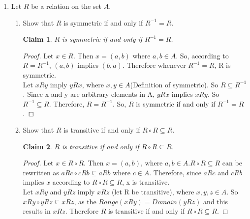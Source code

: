 \documentclass[11pt]{letter}
\newtheorem{claim}{Claim}
\theoremstyle{definition}
\begin{document}
\begin{description}
\begin{enumerate}
\begin{enumerate}
                          
			\end{enumerate}
		
		\item  Let $R$ be a relation on the set $A$. 
			\begin{enumerate}
			\item Show that $R$ is symmetric if and only if $R^{-1}=R$.
                          \begin{claim}
                            $R$ is symmetric if and only if $R^{-1}=R$.
                          \end{claim}
                          \begin{proof}
                            Let $x\in R$. Then $x=(a,b)$ where $a,b\in A$. So, according to $R=R^{-1}$, $(a,b)$ implies $(b,a)$. Therefore whenever $R^{-1}=R$, R is symmetric. \\
                            Let $xRy$ imply $yRx$, where $x,y\in A$(Definition of symmetric). So $R\subseteq R^{-1}$. Since x and y are arbitrary elements in A, $yRx$ implies $xRy$. So $R^{-1}\subseteq R$. Therefore, $R=R^{-1}$. So, $R$ is symmetric if and only if $R^{-1}=R$.
                          \end{proof}
                          
                          
			\item Show that $R$ is transitive if and only if $R\circ R\subseteq R$.
                          \begin{claim}
                            $R$ is transitive if and only if $R\circ R\subseteq R$.
                          \end{claim}
                          \begin{proof}
                            Let $x\in R\circ R$. Then $x=(a,b)$, where $a,b\in A$.$R\circ R\subseteq R$ can be rewritten as  $aRc\circ cRb\subseteq aRb$ where $c\in A$. Therefore, since $aRc$ and $cRb$ implies $x$ according to $R\circ R\subseteq R$,  x is transitive. \\
                            Let $xRy$ and $yRz$ imply $xRz$ (let R be transitive), where $x,y,z\in A$. So $xRy\circ yRz\subseteq xRz$, as the $Range(xRy)=Domain(yRz)$ and this results in $xRz$. Therefore $R$ is transitive if and only if $R\circ R\subseteq R$.
                          \end{proof}
                          
                          
			\end{enumerate}
			

\end{enumerate}
\end{description}
\end{document}
